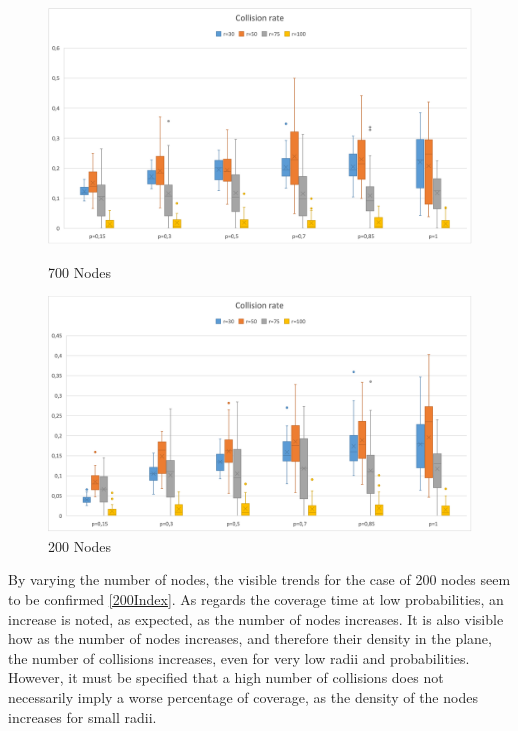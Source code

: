 \begin{figure}[H]
  \includegraphics[width=\linewidth]{./images/Collision700Boxplot.png}
  \caption{700 Nodes}\label{fig:awesome_image1}
\endminipage\hfill
{}
  \includegraphics[width=\linewidth]{./images/Collision200Boxplot.png}
  \caption{200 Nodes}\label{fig:awesome_image2}
\endminipage
\end{figure}

By varying the number of nodes, the visible trends for the case of 200 nodes seem to be confirmed \ref{200Index}. As regards the coverage time at low probabilities, an increase is noted, as expected, as the number of nodes increases. It is also visible how as the number of nodes increases, and therefore their density in the plane, the number of collisions increases, even for very low radii and probabilities. However, it must be specified that a high number of collisions does not necessarily imply a worse percentage of coverage, as the density of the nodes increases for small radii.